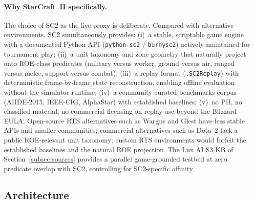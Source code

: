 \documentclass{article}
\theoremstyle{definition}
\begin{document}
\paragraph{Why StarCraft~II specifically.} The choice of SC2 as the live proxy is deliberate. Compared with alternative environments, SC2 simultaneously provides: (i)~a stable, scriptable game engine with a documented Python API (\texttt{python-sc2} / \texttt{burnysc2}) actively maintained for tournament play; (ii)~a unit taxonomy and zone geometry that naturally project onto ROE-class predicates (military versus worker, ground versus air, ranged versus melee, support versus combat); (iii)~a replay format (\texttt{.SC2Replay}) with deterministic frame-by-frame state reconstruction, enabling offline evaluation without the simulator runtime; (iv)~a community-curated benchmarks corpus (AIIDE-2015, IEEE-CIG, AlphaStar) with established baselines; (v)~no PII, no classified material, no commercial licensing on replay use beyond the Blizzard EULA. Open-source RTS alternatives such as Wargus and Glest have less stable APIs and smaller communities; commercial alternatives such as Dota~2 lack a public ROE-relevant unit taxonomy; custom RTS environments would forfeit the established baselines and the natural ROE projection. The Lux AI S3 KB of Section~\ref{subsec:sources} provides a parallel game-grounded testbed at zero predicate overlap with SC2, controlling for SC2-specific affinity.


\subsection{Architecture}\label{subsec:sc2live-arch}
\end{document}
